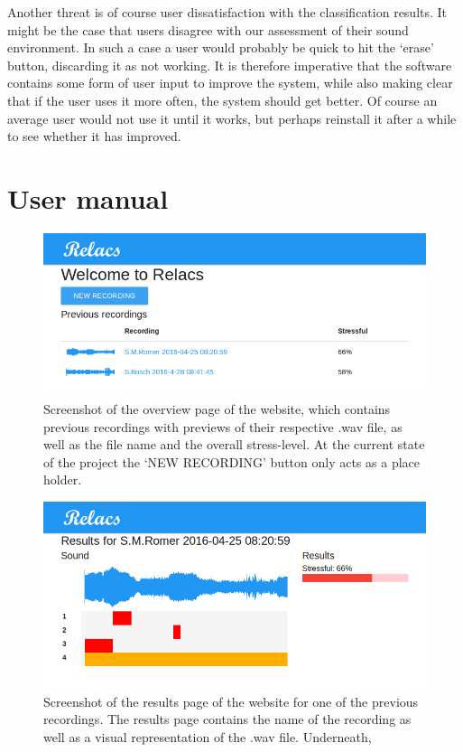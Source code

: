 \documentclass[a4paper]{article}
\begin{document}
Another threat is of course user dissatisfaction with the classification results.
It might be the case that users disagree with our assessment of their sound environment.
In such a case a user would probably be quick to hit the `erase' button, discarding it as not working.
It is therefore imperative that the software contains some form of user input to improve the system, while also making clear that if the user uses it more often, the system should get better.
Of course an average user would not use it until it works, but perhaps reinstall it after a while to see whether it has improved.

\section{User manual}

\begin{figure}[h]
\centering
\includegraphics[width=0.9\linewidth]{./Website}
\caption{Screenshot of the overview page of the website, which contains previous recordings with previews of their respective .wav file, as well as the file name and the overall stress-level. At the current state of the project the `NEW RECORDING' button only acts as a place holder.}
\label{fig:Website}
\end{figure}

\begin{figure}[h]
\centering
\includegraphics[width=0.9\linewidth]{./Audio1Results}
\caption{Screenshot of the results page of the website for one of the previous recordings. The results page contains the name of the recording as well as a visual representation of the .wav file. Underneath,  }
\label{fig:Audio1}
\end{figure}
\end{document}
